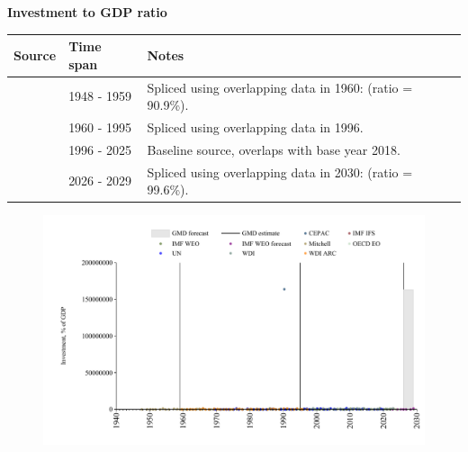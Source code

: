 \documentclass[12pt,a4paper,landscape]{article}
\begin{document}
\begin{adjustbox}{max totalsize={\paperwidth}{\paperheight},center}
\begin{minipage}[t][\textheight][t]{\textwidth}
\vspace*{0.5cm}
{}
\begin{center}
{\Large\bfseries Investment to GDP ratio}
\end{center}
\vspace{0.5cm}
\begin{table}[H]
\centering
\small
\begin{tabular}{|l|l|l|}
\hline
\textbf{Source} & \textbf{Time span} & \textbf{Notes} \\
\hline
\rowcolor{white}\cite{Mitchell}& 1948 - 1959 &Spliced using overlapping data in 1960: (ratio = 90.9\%). \\
\rowcolor{lightgray}\cite{WDI}& 1960 - 1995 &Spliced using overlapping data in 1996. \\
\rowcolor{white}\cite{OECD_EO}& 1996 - 2025 &Baseline source, overlaps with base year 2018. \\
\rowcolor{lightgray}\cite{IMF_WEO_forecast}& 2026 - 2029 &Spliced using overlapping data in 2030: (ratio = 99.6\%). \\
\hline
\end{tabular}
\end{table}
\begin{figure}[H]
\centering
\includegraphics[width=\textwidth,height=0.6\textheight,keepaspectratio]{graphs/BRA_inv_GDP.pdf}
\end{figure}
\end{minipage}
\end{adjustbox}
\end{document}
